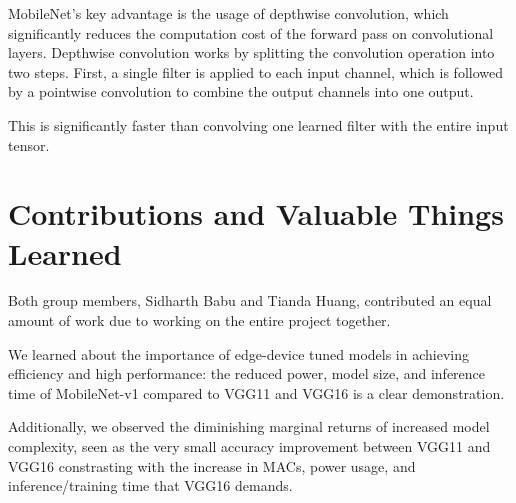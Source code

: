\documentclass{article}
\begin{document}
MobileNet's key advantage is the usage of depthwise convolution, which significantly reduces the computation cost of the forward pass on convolutional layers.
Depthwise convolution works by splitting the convolution operation into two steps. First, a single filter is applied to each input channel, which is followed by a pointwise convolution to combine the output channels into one output.

This is significantly faster than convolving one learned filter with the entire input tensor. 

\section*{Contributions and Valuable Things Learned}
Both group members, Sidharth Babu and Tianda Huang, contributed an equal amount of work due to working on the entire project together.

We learned about the importance of edge-device tuned models in achieving efficiency and high performance: the reduced power, model size, and inference time of MobileNet-v1 compared to VGG11 and VGG16 is a clear demonstration.

Additionally, we observed the diminishing marginal returns of increased model complexity, seen as the very small accuracy improvement between VGG11 and VGG16 constrasting with the increase in MACs, power usage, and inference/training time that VGG16 demands.
\end{document}
